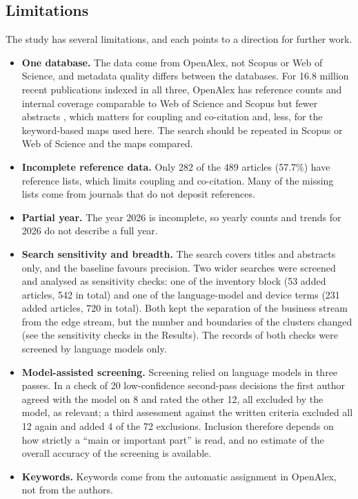 \subsection{Limitations}
The study has several limitations, and each points to a direction for further work.
\begin{itemize}
  \item \textbf{One database.} The data come from OpenAlex, not Scopus or Web of Science, and metadata quality differs between the databases. For 16.8 million recent publications indexed in all three, OpenAlex has reference counts and internal coverage comparable to Web of Science and Scopus but fewer abstracts \parencite{culbert2025}, which matters for coupling and co-citation and, less, for the keyword-based maps used here. The search should be repeated in Scopus or Web of Science and the maps compared.
  \item \textbf{Incomplete reference data.} Only 282 of the 489 articles (57.7\%) have reference lists, which limits coupling and co-citation. Many of the missing lists come from journals that do not deposit references.
  \item \textbf{Partial year.} The year 2026 is incomplete, so yearly counts and trends for 2026 do not describe a full year.
  \item \textbf{Search sensitivity and breadth.} The search covers titles and abstracts only, and the baseline favours precision. Two wider searches were screened and analysed as sensitivity checks: one of the inventory block (53 added articles, 542 in total) and one of the language-model and device terms (231 added articles, 720 in total). Both kept the separation of the business stream from the edge stream, but the number and boundaries of the clusters changed (see the sensitivity checks in the Results). The records of both checks were screened by language models only.
  \item \textbf{Model-assisted screening.} Screening relied on language models in three passes. In a check of 20 low-confidence second-pass decisions the first author agreed with the model on 8 and rated the other 12, all excluded by the model, as relevant; a third assessment against the written criteria excluded all 12 again and added 4 of the 72 exclusions. Inclusion therefore depends on how strictly a ``main or important part'' is read, and no estimate of the overall accuracy of the screening is available.
  \item \textbf{Keywords.} Keywords come from the automatic assignment in OpenAlex, not from the authors.

\end{itemize}

